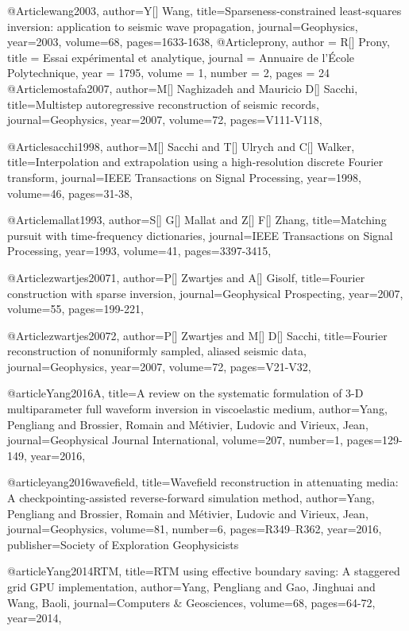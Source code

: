 {@Article{wang2003,
  author={Y[] Wang},
  title={Sparseness-constrained least-squares inversion: application to seismic wave propagation},
  journal={Geophysics},
  year=2003,
  volume=68,
  pages={1633-1638},
}
@Article{prony,
  author = 	 {R[] Prony},
  title = 	 {Essai exp\'{e}rimental et analytique},
  journal = 	 {Annuaire de l'\'{E}cole Polytechnique},
  year = 	 1795,
  volume = 	 1,
  number = 	 2,
  pages = 	 24}
@Article{mostafa2007,
  author={M[] Naghizadeh and Mauricio D[] Sacchi},
  title={Multistep autoregressive reconstruction of seismic records},
  journal={Geophysics},
  year=2007,
  volume=72,
  pages={V111-V118},
}

@Article{sacchi1998,
  author={M[] Sacchi and T[] Ulrych and C[] Walker},
  title={Interpolation and extrapolation using a high-resolution discrete Fourier transform},
  journal={IEEE Transactions on Signal Processing},
  year=1998,
  volume=46,
  pages={31-38},
}

@Article{mallat1993,
  author={S[] G[] Mallat and Z[] F[] Zhang},
  title={Matching pursuit with time-frequency dictionaries},
  journal={IEEE Transactions on Signal Processing},
  year=1993,
  volume=41,
  pages={3397-3415},
}

@Article{zwartjes20071,
  author={P[] Zwartjes and A[] Gisolf},
  title={Fourier construction with sparse inversion},
  journal={Geophysical Prospecting},
  year=2007,
  volume=55,
  pages={199-221},
}

@Article{zwartjes20072,
  author={P[] Zwartjes and M[] D[] Sacchi},
  title={Fourier reconstruction of nonuniformly sampled, aliased seismic data},
  journal={Geophysics},
  year=2007,
  volume=72,
  pages={V21-V32},
}

@article{Yang2016A,
  title={A review on the systematic formulation of 3-{D} multiparameter full waveform inversion in viscoelastic medium},
  author={Yang, Pengliang and Brossier, Romain and Métivier, Ludovic and Virieux, Jean},
  journal={Geophysical Journal International},
  volume={207},
  number={1},
  pages={129-149},
  year={2016},
}


@article{yang2016wavefield,
  title={Wavefield reconstruction in attenuating media: A checkpointing-assisted reverse-forward simulation method},
  author={Yang, Pengliang and Brossier, Romain and M{\'e}tivier, Ludovic and Virieux, Jean},
  journal={Geophysics},
  volume={81},
  number={6},
  pages={R349--R362},
  year={2016},
  publisher={Society of Exploration Geophysicists}
}


@article{Yang2014RTM,
  title={{RTM} using effective boundary saving: A staggered grid GPU implementation},
  author={Yang, Pengliang and Gao, Jinghuai and Wang, Baoli},
  journal={Computers \& Geosciences},
  volume={68},
  pages={64-72},
  year={2014},
}

}
